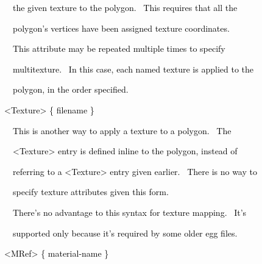 \documentclass[a4paper]{article}
\newcommand\textstyleOOoComputerKeyWord[1]{\textrm{\textcolor[rgb]{0.0,0.0,0.5019608}{#1}}}
\begin{document}
{\color{black}
\textstyleOOoComputerKeyWord{\textcolor{black}{\ \ \ \ the given texture to the polygon. \ This requires that all the}}}

{\color{black}
\textstyleOOoComputerKeyWord{\textcolor{black}{\ \ \ \ polygon's vertices have been assigned texture coordinates.}}}


\bigskip

{\color{black}
\textstyleOOoComputerKeyWord{\textcolor{black}{\ \ \ \ This attribute may be repeated multiple times to specify}}}

{\color{black}
\textstyleOOoComputerKeyWord{\textcolor{black}{\ \ \ \ multitexture. \ In this case, each named texture is applied to
the}}}

{\color{black}
\textstyleOOoComputerKeyWord{\textcolor{black}{\ \ \ \ polygon, in the order specified.}}}


\bigskip


\bigskip

{\color{black}
\textstyleOOoComputerKeyWord{\textcolor{black}{\ \ {\textless}Texture{\textgreater} \{ filename \}}}}


\bigskip

{\color{black}
\textstyleOOoComputerKeyWord{\textcolor{black}{\ \ \ \ This is another way to apply a texture to a polygon. \ The}}}

{\color{black}
\textstyleOOoComputerKeyWord{\textcolor{black}{\ \ \ \ {\textless}Texture{\textgreater} entry is defined
{\textquotedbl}inline{\textquotedbl} to the polygon, instead of}}}

{\color{black}
\textstyleOOoComputerKeyWord{\textcolor{black}{\ \ \ \ referring to a {\textless}Texture{\textgreater} entry given
earlier. \ There is no way to}}}

{\color{black}
\textstyleOOoComputerKeyWord{\textcolor{black}{\ \ \ \ specify texture attributes given this form.}}}


\bigskip

{\color{black}
\textstyleOOoComputerKeyWord{\textcolor{black}{\ \ \ \ There's no advantage to this syntax for texture mapping.
\ It's}}}

{\color{black}
\textstyleOOoComputerKeyWord{\textcolor{black}{\ \ \ \ supported only because it's required by some older egg files.}}}


\bigskip


\bigskip

{\color{black}
\textstyleOOoComputerKeyWord{\textcolor{black}{\ \ {\textless}MRef{\textgreater} \{ material-name \}}}}
\end{document}
